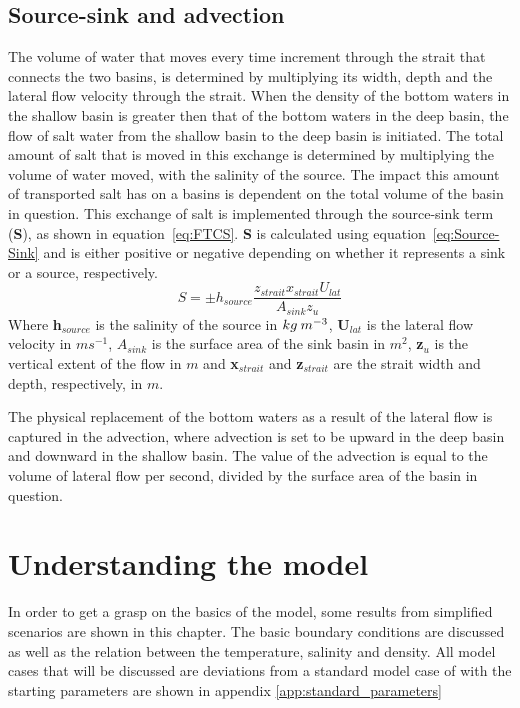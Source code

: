 \documentclass[twocolumn]{article}
\begin{document}
\subsection{Source-sink and advection}
The volume of water that moves every time increment through the strait that connects the two basins, is determined by multiplying its width, depth and the lateral flow velocity through the strait. When the density of the bottom waters in the shallow basin is greater then that of the bottom waters in the deep basin, the flow of salt water from the shallow basin to the deep basin is initiated. The total amount of salt that is moved in this exchange is determined by multiplying the volume of water moved, with the salinity of the source. The impact this amount of transported salt has on a basins is dependent on the total volume of the basin in question. This exchange of salt is implemented through the source-sink term (\textbf{S}), as shown in equation~\ref{eq:FTCS}. \textbf{S} is calculated using equation~\ref{eq:Source-Sink} and is either positive or negative depending on whether it represents a sink or a source, respectively.
\begin{equation}
    S = \pm h_{source} \frac{ z_{strait} x_{strait} U_{lat} }{A_{sink} z_u} 
    \label{eq:Source-Sink}
\end{equation}
Where \textbf{h}$_{source}$ is the salinity of the source in $kg \hspace{0.8mm} m^{-3}$, \textbf{U}$_{lat}$ is the lateral flow velocity in $ms^{-1}$, $A_{sink}$ is the surface area of the sink basin in $m^2$, \textbf{z}$_u$ is the vertical extent of the flow in $m$ and \textbf{x}$_{strait}$ and \textbf{z}$_{strait}$ are the strait width and depth, respectively, in $m$.

The physical replacement of the bottom waters as a result of the lateral flow is captured in the advection, where advection is set to be upward in the deep basin and downward in the shallow basin. The value of the advection is equal to the volume of lateral flow per second, divided by the surface area of the basin in question. 



\section{Understanding the model}
In order to get a grasp on the basics of the model, some results from simplified scenarios are shown in this chapter. The basic boundary conditions are discussed as well as the relation between the temperature, salinity and density. All model cases that will be discussed are deviations from a standard model case of with the starting parameters are shown in appendix \ref{app:standard_parameters}
\end{document}
